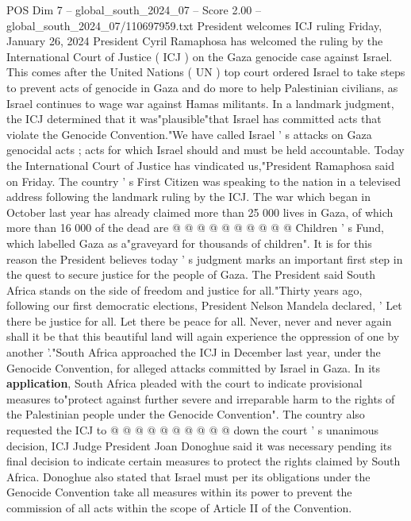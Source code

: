 \begin{textsample}{POS Dim 7 – global\_south\_2024\_07 – Score 2.00 – global\_south\_2024\_07/110697959.txt}  \label{ex:f7_pos_112}
President welcomes ICJ ruling Friday, January 26, 2024 President Cyril Ramaphosa has welcomed the ruling by the International Court of Justice ( ICJ ) on the Gaza genocide case against Israel.
This comes after the United Nations ( UN ) top court ordered Israel to take steps to prevent acts of genocide in Gaza and do more to help Palestinian civilians, as Israel continues to wage war against Hamas militants.
In a landmark judgment, the ICJ determined that it was"plausible"that Israel has committed acts that violate the Genocide Convention."We have called Israel ' s attacks on Gaza genocidal acts ; acts for which Israel should and must be held accountable.
Today the International Court of Justice has vindicated us,"President Ramaphosa said on Friday.
The country ' s First Citizen was speaking to the nation in a televised address following the landmark ruling by the ICJ.
The war which began in October last year has already claimed more than 25 000 lives in Gaza, of which more than 16 000 of the dead are @ @ @ @ @ @ @ @ @ @ Children ' s Fund, which labelled Gaza as a"graveyard for thousands of children".
It is for this reason the President believes today ' s judgment marks an important first step in the quest to secure justice for the people of Gaza.
The President said South Africa stands on the side of freedom and justice for all."Thirty years ago, following our first democratic elections, President Nelson Mandela declared, ' Let there be justice for all.
Let there be peace for all.
Never, never and never again shall it be that this beautiful land will again experience the oppression of one by another '."South Africa approached the ICJ in December last year, under the Genocide Convention, for alleged attacks committed by Israel in Gaza.
In its \textbf{application}, South Africa pleaded with the court to indicate provisional measures to"protect against further severe and irreparable harm to the rights of the Palestinian people under the Genocide Convention".
The country also requested the ICJ to @ @ @ @ @ @ @ @ @ @ down the court ' s unanimous decision, ICJ Judge President Joan Donoghue said it was necessary pending its final decision to indicate certain measures to protect the rights claimed by South Africa.
Donoghue also stated that Israel must per its obligations under the Genocide Convention take all measures within its power to prevent the commission of all acts within the scope of Article II of the Convention.

\end{textsample}
